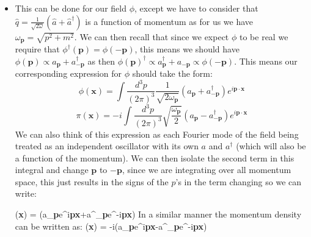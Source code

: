 \documentclass[11pt]{article}
\renewenvironment{flalign}{\vspace{-3mm}\empheq[box=\tcbhighmath]{align}}{\endempheq}
\numberwithin{equation}{section}
\begin{document}
\begin{itemize}
\item This can be done for our field $\phi$, except we have to consider that $\hat{q} = \frac{1}{\sqrt{2 \omega}}(\hat{a}+\hat{a}^{\dagger})$ is a function of momentum as for us we have $\omega_{\textbf{p}} = \sqrt{p^2+m^2}$. We can then recall that since we expect $\phi$ to be real we require that $\phi^{\dagger}(\textbf{p}) = \phi(-\textbf{p})$, this means we should have $\phi(\textbf{p}) \propto a_{\textbf{p}}+a^{\dagger}_{-\textbf{p}}$ as then $\phi(\textbf{p})^{\dagger} \propto a_{\textbf{p}}^{\dagger}+ a_{-\textbf{p}} \propto \phi(-\textbf{p})$. This means our corresponding expression for $\phi$ should take the form:
\begin{equation}
\label{phi_1}
  \phi(\textbf{x}) = \int \frac{d^3p}{(2\pi)^3}\frac{1}{\sqrt{2\omega_{\textbf{p}}}}\left(a_{\textbf{p}}+a^{\dagger}_{-\textbf{p}}\right)e^{i\textbf{p}\cdot\textbf{x}} 
\end{equation} 
\begin{equation}
\label{pi_1}
  \pi(\textbf{x}) = -i\int \frac{d^3p}{(2\pi)^3}\sqrt{\frac{\omega_{\textbf{p}}}{2}}\left(a_{\textbf{p}}-a^{\dagger}_{-\textbf{p}}\right)e^{i\textbf{p}\cdot\textbf{x}} 
\end{equation} 
We can also think of this expression as each Fourier mode of the field being treated as an independent oscillator with its own $a$ and $a^{\dagger}$ (which will also be a function of the momentum). We can then isolate the second term in this integral and change $\textbf{p}$ to $-\textbf{p}$, since we are integrating over all momentum space, this just results in the signs of the $p$'s in the term changing so we can write:

\begin{flalign}
\label{phi_2}
  \phi(\textbf{x}) = \int {}\left(a_{\textbf{p}}e^{i\textbf{p}\cdot\textbf{x}}+a^{\dagger}_{\textbf{p}}e^{-i\textbf{p}\cdot\textbf{x}}\right) 
\end{flalign}
In a similar manner the momentum density can be written as:
\begin{flalign}
\label{pi_2}
  \pi(\textbf{x}) = -i\int {}\left(a_{\textbf{p}}e^{i\textbf{p}\cdot\textbf{x}}-a^{\dagger}_{\textbf{p}}e^{-i\textbf{p}\cdot\textbf{x}}\right) 
\end{flalign}


\end{itemize}
\end{document}
